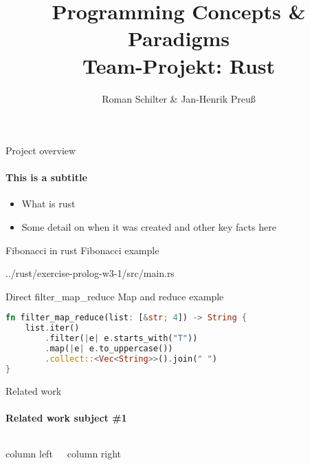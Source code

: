 \documentclass[aspectratio=169, professionalfonts]{beamer}
\title[PCP-Rust]{Programming Concepts \& Paradigms\\ Team-Projekt: Rust}
\author[Schilter \& Preuß]{Roman Schilter \& Jan-Henrik Preuß}
\newcommand{\mylisting}[6]{
    
    {#6}
}
\begin{document}
    \typesetFrontSlides



    \begin{frame}{Project overview}
        \framesubtitle{This is a subtitle}
        \begin{itemize}
            \item What is rust
            \item Some detail on when it was created and other key facts here
        \end{itemize}

    \end{frame}


    \begin{frame}{Fibonacci in rust}
        Fibonacci example

        \mylisting{22}{31}{Rust}{Rust}{Fibonacci recursive}{../rust/exercise-prolog-w3-1/src/main.rs}

    \end{frame}

    \begin{frame}[fragile]{Direct filter\_map\_reduce}
        Map and reduce example

        \begin{lstlisting}[language=Rust,escapechar=@,label={lst:map_reduce-test}]
fn filter_map_reduce(list: [&str; 4]) -> String {
    list.iter()
        .filter(|e| e.starts_with("T"))
        .map(|e| e.to_uppercase())
        .collect::<Vec<String>>().join(" ")
}\end{lstlisting}

    \end{frame}


    \begin{frame}{Related work}
        \framesubtitle{Related work subject \#1}
        \begin{columns}[T]

            column left

            column right
        \end{columns}


    \end{frame}
\end{document}
